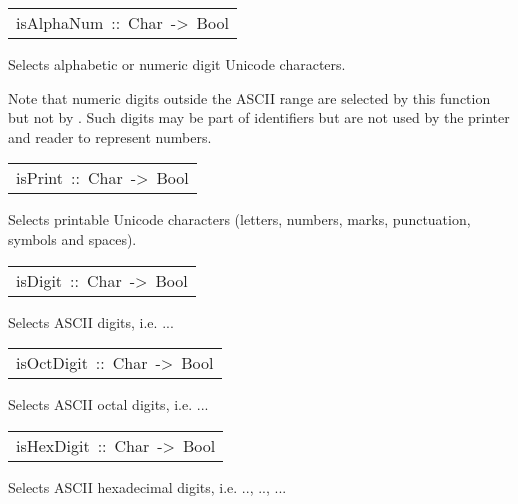 \begin{haddockdesc}
\item[\begin{tabular}{@{}l}
isAlphaNum\ ::\ Char\ ->\ Bool
\end{tabular}]\haddockbegindoc
Selects alphabetic or numeric digit Unicode characters.
\par
Note that numeric digits outside the ASCII range are selected by this
 function but not by .  Such digits may be part of identifiers
 but are not used by the printer and reader to represent numbers.
\par

\end{haddockdesc}
\begin{haddockdesc}
\item[\begin{tabular}{@{}l}
isPrint\ ::\ Char\ ->\ Bool
\end{tabular}]\haddockbegindoc
Selects printable Unicode characters
 (letters, numbers, marks, punctuation, symbols and spaces).
\par

\end{haddockdesc}
\begin{haddockdesc}
\item[\begin{tabular}{@{}l}
isDigit\ ::\ Char\ ->\ Bool
\end{tabular}]\haddockbegindoc
Selects ASCII digits, i.e. ...
\par

\end{haddockdesc}
\begin{haddockdesc}
\item[\begin{tabular}{@{}l}
isOctDigit\ ::\ Char\ ->\ Bool
\end{tabular}]\haddockbegindoc
Selects ASCII octal digits, i.e. ...
\par

\end{haddockdesc}
\begin{haddockdesc}
\item[\begin{tabular}{@{}l}
isHexDigit\ ::\ Char\ ->\ Bool
\end{tabular}]\haddockbegindoc
Selects ASCII hexadecimal digits,
 i.e. .., .., ...
\par

\end{haddockdesc}
